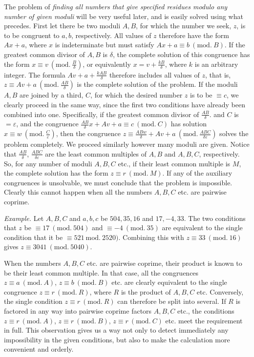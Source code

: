 The problem of \emph{finding all numbers that give specified residues modulo any number of given moduli} will be very useful later, and is easily solved using what precedes. First let there be two moduli $A,B$, for which the number
we seek, $z$, is to be congruent to $a,b$, respectively. All values of $z$ therefore have the form $Ax+a$, where $x$ is indeterminate but must satisfy $Ax+a\equiv b\ (\mathrm{mod.}\ B)$. If the greatest common divisor of $A,B$ is $\delta$, the complete solution of this congruence has the form $x\equiv v\ (\mathrm{mod.}\ \frac{B}{\delta})$, or equivalently $x=v+\frac{kB}{\delta}$, where $k$ is an arbitrary integer. The formula $Av+a+\frac{kAB}{\delta}$ therefore includes all values of $z$, that is, $z\equiv Av+a\ (\mathrm{mod.}\ \frac{AB}{\delta})$ is the complete solution of the problem. If the moduli $A,B$ are joined by a third, $C$, for which the desired number $z$ is to be $\equiv c$, we clearly proceed in the same way, since the first two conditions have already been combined into one. Specifically, if the greatest common divisor of $\frac{AB}{\delta}.$ and $C$ is $=\varepsilon$, and the congruence $\frac{AB}{\delta}x+Av+a\equiv c\ (\mathrm{mod.}\ C)$ has solution $x\equiv w\ (\mathrm{mod.}\ \frac{C}{\varepsilon})$, then the congruence $z\equiv\frac{ABw}{\delta}+Av+a\ (\mathrm{mod.}\ \frac{ABC}{\delta\varepsilon})$ solves the problem completely. We proceed similarly however many moduli are given. Notice that $\frac{AB}{\delta}$, $\frac{ABC}{\delta\varepsilon}$ are the least common multiples of $A,B$ and $A,B,C$, respectively. So, for any number of moduli $A,B,C$ etc., if their least common multiple is $M$, the complete solution has the form $z\equiv r\ (\mathrm{mod.}\ M)$. If any of the auxiliary congruences is unsolvable, we must conclude that the problem is impossible. Clearly this cannot happen when all the numbers $A,B,C$ etc. are pairwise coprime.

\emph{Example.} Let $A,B,C$ and $a,b,c$ be $504,35,16$ and $17,-4,33$. The two conditions that $z$ be $\equiv 17\ (\mathrm{mod.}\ 504)$ and $\equiv -4\ (\mathrm{mod.}\ 35)$ are equivalent to the single condition that it be $\equiv 521\ \mathrm{mod.}\ 2520)$. Combining this with $z\equiv 33\ (\mathrm{mod.}\ 16)$ gives $z\equiv 3041\ (\mathrm{mod.}\ 5040)$.


When the numbers $A,B,C$ etc. are pairwise coprime, their product is known to be their least common multiple. In that case, all the congruences $z\equiv a\ (\mathrm{mod.}\ A)$, $z\equiv b\ (\mathrm{mod.}\ B)$ etc. are clearly equivalent to the single congruence $z\equiv r\ (\mathrm{mod.}\ R)$, where $R$ is the product of $A,B,C$ etc. Conversely, the single condition $z\equiv r\ (\mathrm{mod.}\ R)$ can therefore be split into several. If $R$ is factored in any way into pairwise coprime factors $A,B,C$ etc., the conditions $z\equiv r\ (\mathrm{mod.}\ A)$, $z\equiv r\ (\mathrm{mod.}\ B)$, $z\equiv r\ (\mathrm{mod.}\ C)$ etc. meet the requirement in full. This observation gives us a way
not only to detect immediately any impossibility in the given conditions, but also to make the calculation more convenient and orderly.

